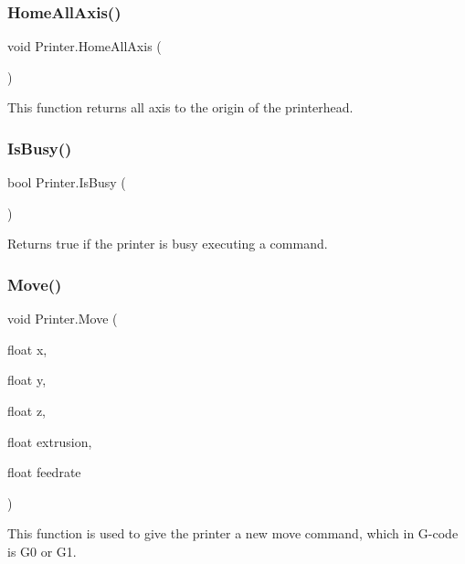 \subsubsection{\texorpdfstring{Home\+All\+Axis()}{HomeAllAxis()}}
{\footnotesize\ttfamily void Printer.\+Home\+All\+Axis (\begin{DoxyParamCaption}{ }\end{DoxyParamCaption})}



This function returns all axis to the origin of the printerhead. 

\mbox{\label{class_printer_a5f4ec3c78049dfb3b29c2d2e069326c2}} 
\subsubsection{\texorpdfstring{Is\+Busy()}{IsBusy()}}
{\footnotesize\ttfamily bool Printer.\+Is\+Busy (\begin{DoxyParamCaption}{ }\end{DoxyParamCaption})}



Returns true if the printer is busy executing a command. 

\mbox{\label{class_printer_adfa651ad28cdcb1b26f135f32d414f74}} 
\subsubsection{\texorpdfstring{Move()}{Move()}}
{\footnotesize\ttfamily void Printer.\+Move (\begin{DoxyParamCaption}\item[{float}]{x,  }\item[{float}]{y,  }\item[{float}]{z,  }\item[{float}]{extrusion,  }\item[{float}]{feedrate }\end{DoxyParamCaption})}



This function is used to give the printer a new move command, which in G-\/code is G0 or G1. 


